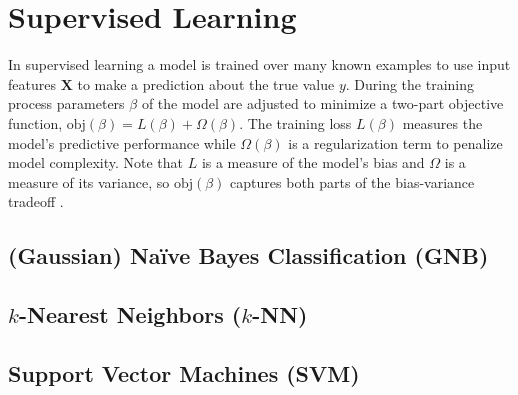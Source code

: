 \chapter{Supervised Learning}
\label{ml:supervised}

In supervised learning a model is trained over many known examples
to use input features $\mathbf{X}$ to make a prediction \yhat about the true value $y$.
During the training process parameters $\beta$ of
the model are adjusted to minimize a two-part objective function,
$\text{obj}\left(\beta\right) = L\left(\beta\right) + \Omega\left(\beta\right)$.
The training loss $L\left(\beta\right)$ measures the model's predictive performance
while $\Omega\left(\beta\right)$ is a regularization term to penalize model complexity.
Note that $L$ is a measure of the model's bias and $\Omega$ is a measure of its variance,
so $\text{obj}\left(\beta\right)$ captures both parts of the bias-variance tradeoff \cite{HastieTF09}.

\section{(Gaussian) N{a\"i}ve Bayes Classification (GNB)}
\label{ml:supervised:Bayes}

\section{\texorpdfstring{$k$}{k}-Nearest Neighbors (\texorpdfstring{$k$}{k}-NN)}
\label{ml:supervised:kNN}

\section{Support Vector Machines (SVM)}
\label{ml:supervised:SVM}

